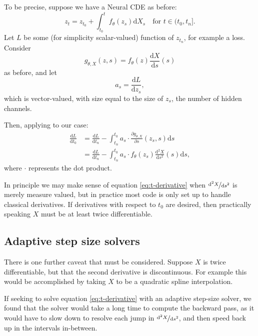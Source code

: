 \documentclass{article}
\theoremstyle{plain}
\theoremstyle{definition}
\newcommand{\ttfrac}[2]{\nicefrac{#1}{#2}}
\begin{document}
	To be precise, suppose we have a Neural CDE as before:
	\begin{equation*}
	z_t = z_{t_0} + \int_{t_0}^t f_\theta(z_s) \mathrm{d} X_s\quad\text{for $t \in (t_0, t_n]$}.
	\end{equation*}
	Let $L$ be some (for simplicity scalar-valued) function of $z_{t_n}$, for example a loss. Consider
	\begin{equation*}
	g_{\theta, X}(z, s) = f_\theta(z) \frac{\mathrm{d}X}{\mathrm{d}s}(s)
	\end{equation*}
	as before, and let
	\begin{equation*}
	a_s = \frac{\mathrm{d}L}{\mathrm{d}z_s},
	\end{equation*}
	which is vector-valued, with size equal to the size of $z_s$, the number of hidden channels.
	
	Then, applying \cite[Equation 52]{neural-odes} to our case:
	\begin{align}
	\frac{\mathrm{d} L}{\mathrm{d} t_0} &= \frac{\mathrm{d} L}{\mathrm{d} t_n} -\int_{t_n}^{t_0} a_s \cdot \frac{\partial g_{\theta, X}}{\partial s}(z_s, s) \mathrm{d}s\nonumber\\
	&= \frac{\mathrm{d} L}{\mathrm{d} t_n} -\int_{t_n}^{t_0} a_s \cdot f_\theta(z_s) \frac{\mathrm{d}^2 X}{\mathrm{d} s^2}(s) \mathrm{d}s,\label{eq:t-derivative}
	\end{align}
	where $\cdot$ represents the dot product.
	
	In principle we may make sense of equation \eqref{eq:t-derivative} when $\ttfrac{\mathrm{d}^2 X}{\mathrm{d} s^2}$ is merely measure valued, but in practice most code is only set up to handle classical derivatives. If derivatives with respect to $t_0$ are desired, then practically speaking $X$ must be at least twice differentiable.
	
	\subsection{Adaptive step size solvers}
	There is one further caveat that must be considered. Suppose $X$ is twice differentiable, but that the second derivative is discontinuous. For example this would be accomplished by taking $X$ to be a quadratic spline interpolation.
	
	If seeking to solve equation \eqref{eq:t-derivative} with an adaptive step-size solver, we found that the solver would take a long time to compute the backward pass, as it would have to slow down to resolve each jump in $\ttfrac{\mathrm{d}^2 X}{\mathrm{d} s^2}$, and then speed back up in the intervals in-between.
	
\end{document}
